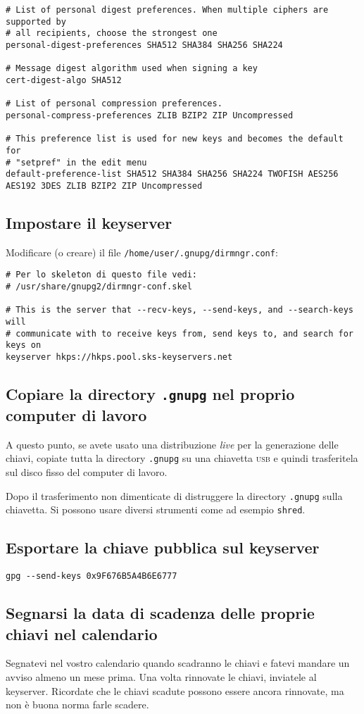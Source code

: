 \begin{lstlisting}
# List of personal digest preferences. When multiple ciphers are supported by
# all recipients, choose the strongest one
personal-digest-preferences SHA512 SHA384 SHA256 SHA224

# Message digest algorithm used when signing a key
cert-digest-algo SHA512

# List of personal compression preferences.
personal-compress-preferences ZLIB BZIP2 ZIP Uncompressed

# This preference list is used for new keys and becomes the default for
# "setpref" in the edit menu
default-preference-list SHA512 SHA384 SHA256 SHA224 TWOFISH AES256 AES192 3DES ZLIB BZIP2 ZIP Uncompressed
\end{lstlisting}

\subsection{Impostare il keyserver}

Modificare (o creare) il file \texttt{/home/user/.gnupg/dirmngr.conf}:

\begin{lstlisting}
# Per lo skeleton di questo file vedi:
# /usr/share/gnupg2/dirmngr-conf.skel

# This is the server that --recv-keys, --send-keys, and --search-keys will
# communicate with to receive keys from, send keys to, and search for keys on
keyserver hkps://hkps.pool.sks-keyservers.net
\end{lstlisting}

\subsection{Copiare la directory \texttt{.gnupg} nel proprio computer di lavoro}

A questo punto, se avete usato una distribuzione \textit{live} per la
generazione delle chiavi, copiate tutta la directory \texttt{.gnupg} su una
chiavetta \textsc{usb} e quindi trasferitela sul disco fisso del computer di
lavoro.

Dopo il trasferimento non dimenticate di distruggere la directory
\texttt{.gnupg} sulla chiavetta. Si possono usare diversi strumenti come ad
esempio \texttt{shred}.

\subsection{Esportare la chiave pubblica sul keyserver}

\begin{lstlisting}
gpg --send-keys 0x9F676B5A4B6E6777
\end{lstlisting}

\subsection{Segnarsi la data di scadenza delle proprie chiavi nel calendario}

Segnatevi nel vostro calendario quando scadranno le chiavi e fatevi mandare un
avviso almeno un mese prima. Una volta rinnovate le chiavi, inviatele al
keyserver. Ricordate che le chiavi scadute possono essere ancora rinnovate, ma
non è buona norma farle scadere.

